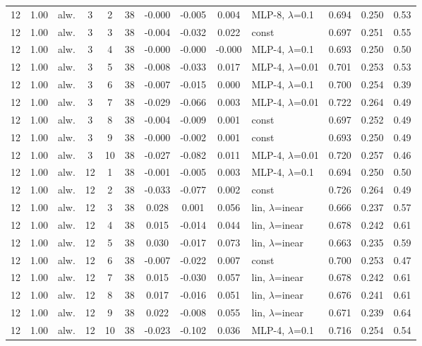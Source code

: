 \documentclass[10pt]{article}
\begin{document}
\begin{scriptsize}
\begin{longtable}{cclcc c ccc l ccc}
12 & 1.00 & alw. & 3 & 2 & 38 & -0.000 & -0.005 & 0.004 & MLP-8, $\lambda$=0.1 & 0.694 & 0.250 & 0.53 \\
12 & 1.00 & alw. & 3 & 3 & 38 & -0.004 & -0.032 & 0.022 & const & 0.697 & 0.251 & 0.55 \\
12 & 1.00 & alw. & 3 & 4 & 38 & -0.000 & -0.000 & -0.000 & MLP-4, $\lambda$=0.1 & 0.693 & 0.250 & 0.50 \\
12 & 1.00 & alw. & 3 & 5 & 38 & -0.008 & -0.033 & 0.017 & MLP-4, $\lambda$=0.01 & 0.701 & 0.253 & 0.53 \\
12 & 1.00 & alw. & 3 & 6 & 38 & -0.007 & -0.015 & 0.000 & MLP-4, $\lambda$=0.1 & 0.700 & 0.254 & 0.39 \\
12 & 1.00 & alw. & 3 & 7 & 38 & -0.029 & -0.066 & 0.003 & MLP-4, $\lambda$=0.01 & 0.722 & 0.264 & 0.49 \\
12 & 1.00 & alw. & 3 & 8 & 38 & -0.004 & -0.009 & 0.001 & const & 0.697 & 0.252 & 0.49 \\
12 & 1.00 & alw. & 3 & 9 & 38 & -0.000 & -0.002 & 0.001 & const & 0.693 & 0.250 & 0.49 \\
12 & 1.00 & alw. & 3 & 10 & 38 & -0.027 & -0.082 & 0.011 & MLP-4, $\lambda$=0.01 & 0.720 & 0.257 & 0.46 \\
12 & 1.00 & alw. & 12 & 1 & 38 & -0.001 & -0.005 & 0.003 & MLP-4, $\lambda$=0.1 & 0.694 & 0.250 & 0.50 \\
12 & 1.00 & alw. & 12 & 2 & 38 & -0.033 & -0.077 & 0.002 & const & 0.726 & 0.264 & 0.49 \\
12 & 1.00 & alw. & 12 & 3 & 38 & 0.028 & 0.001 & 0.056 & lin, $\lambda$=inear & 0.666 & 0.237 & 0.57 \\
12 & 1.00 & alw. & 12 & 4 & 38 & 0.015 & -0.014 & 0.044 & lin, $\lambda$=inear & 0.678 & 0.242 & 0.61 \\
12 & 1.00 & alw. & 12 & 5 & 38 & 0.030 & -0.017 & 0.073 & lin, $\lambda$=inear & 0.663 & 0.235 & 0.59 \\
12 & 1.00 & alw. & 12 & 6 & 38 & -0.007 & -0.022 & 0.007 & const & 0.700 & 0.253 & 0.47 \\
12 & 1.00 & alw. & 12 & 7 & 38 & 0.015 & -0.030 & 0.057 & lin, $\lambda$=inear & 0.678 & 0.242 & 0.61 \\
12 & 1.00 & alw. & 12 & 8 & 38 & 0.017 & -0.016 & 0.051 & lin, $\lambda$=inear & 0.676 & 0.241 & 0.61 \\
12 & 1.00 & alw. & 12 & 9 & 38 & 0.022 & -0.008 & 0.055 & lin, $\lambda$=inear & 0.671 & 0.239 & 0.64 \\
12 & 1.00 & alw. & 12 & 10 & 38 & -0.023 & -0.102 & 0.036 & MLP-4, $\lambda$=0.1 & 0.716 & 0.254 & 0.54 \\

\end{longtable}
\end{scriptsize}
\end{document}
